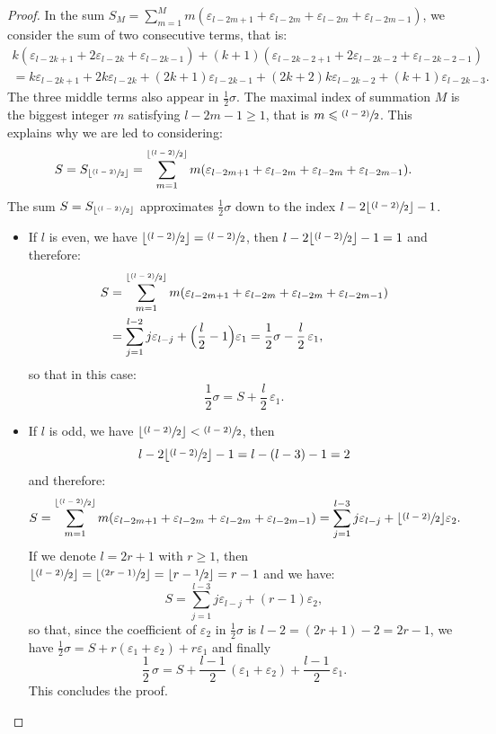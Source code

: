 \documentclass[JEP,XML,SOM,Unicode,published]{cedram}
\newcommand{\psfrac}[2]{\sfrac{(#1)}{#2}}
\theoremstyle{plain}
\theoremstyle{remark}
\theoremstyle{definition}
\begin{document}
\begin{proof}
In the sum $S_M = \sum_{m=1}^M m(\varepsilon_{l-2m+1} + \varepsilon_{l-2m} + \varepsilon_{l-2m} + \varepsilon_{l-2m-1})$, we consider the sum of two consecutive terms, that is:\vspace*{-3pt}
\begin{multline*}
k(\varepsilon_{l-2k+1} + 2\varepsilon_{l-2k} + \varepsilon_{l-2k-1}) + (k+1)(\varepsilon_{l-2k-2+1} + 2\varepsilon_{l-2k-2} + \varepsilon_{l-2k-2-1})\\
= k \varepsilon_{l-2k+1} + 2k \varepsilon_{l-2k} + (2k+1) \varepsilon_{l-2k-1} + (2k+2) k \varepsilon_{l-2k-2} + (k+1) \varepsilon_{l-2k-3}.
\end{multline*}
The three middle terms also appear in ${\frac 12} \sigma$.
The maximal index of summation $M$ is the biggest integer $m$ satisfying $l-2m-1 \geqslant 1$, that is $m \leqslant {\psfrac{l-2}{2}}$.
This explains why we are led to considering:
\[
S = S_{\lfloor {\psfrac{l-2}{2}} \rfloor} = \sum_{m=1}^{\lfloor {\psfrac{l-2}{2}} \rfloor} m(\varepsilon_{l-2m+1} + \varepsilon_{l-2m} + \varepsilon_{l-2m} + \varepsilon_{l-2m-1}).
\]
The sum $S = S_{\lfloor {\psfrac{l-2}{2}} \rfloor}$ approximates ${\frac 12} \sigma$ down to the index $l -2 \lfloor {\psfrac{l-2}{2}} \rfloor - 1$.

\begin{itemize}
\item
If $l$ is even, we have $\lfloor {\psfrac{l-2}{2}} \rfloor = {\psfrac{l-2}{2}}$, then $l -2 \lfloor {\psfrac{l-2}{2}} \rfloor - 1 = 1$ and therefore:
\begin{align*}
S &=\sum_{m=1}^{\lfloor {\psfrac{l-2}{2}} \rfloor} m(\varepsilon_{l-2m+1} + \varepsilon_{l-2m} + \varepsilon_{l-2m} + \varepsilon_{l-2m-1})\\
&= \sum_{j = 1}^{l-2} j \varepsilon_{l-j} + \Bigl({\frac l2} - 1\Bigr) \varepsilon_1 = {\frac 12} \sigma - {\frac l2}\, \varepsilon_1,
\end{align*}
so that in this case:
\[
{\frac 12} \sigma = S + {\frac l2}\, \varepsilon_1.
\]

\item
If $l$ is odd, we have $\lfloor {\psfrac{l-2}{2}} \rfloor < {\psfrac{l-2}{2}}$, then
\[
l -2 \lfloor {\psfrac{l-2}{2}} \rfloor - 1 = l - (l-3) - 1 = 2
\]
and therefore:
\[
S = \sum_{m=1}^{\lfloor {\psfrac{l-2}{2}} \rfloor} m(\varepsilon_{l-2m+1} + \varepsilon_{l-2m} + \varepsilon_{l-2m} + \varepsilon_{l-2m-1})
= \sum_{j = 1}^{l-3} j \varepsilon_{l-j} + \lfloor {\psfrac{l-2}{2}} \rfloor \varepsilon_2.
\]
If we denote $l=2r+1$ with $r \geqslant 1$, then $\lfloor {\psfrac{l-2}{2}} \rfloor = \lfloor \psfrac{2r-1}{2} \rfloor = \lfloor r-\sfrac{1}{2} \rfloor = r-1$ and we have:
\[
S = \sum_{j = 1}^{l-3} j \varepsilon_{l-j} +(r-1) \varepsilon_2,
\]
so that, since the coefficient of $\varepsilon_2$ in ${\frac 12} \sigma$ is $l-2 = (2r+1) - 2 = 2r-1$, we have
${\frac 12} \sigma = S + r(\varepsilon_1 + \varepsilon_2) + r \varepsilon_1$ and finally
\[
{\frac 12}\, \sigma = S + \frac{l-1}{2}\, (\varepsilon_1 + \varepsilon_2) + \frac{l-1}{2}\, \varepsilon_1.
\]
This concludes the proof.\qedhere
\end{itemize}
\end{proof}
\end{document}
